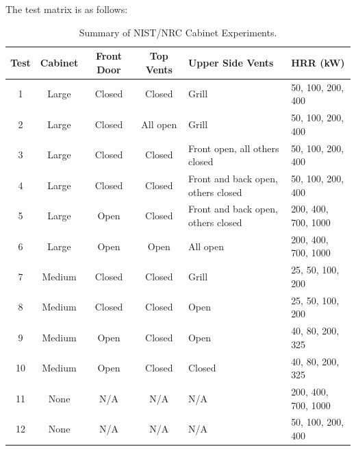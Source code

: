 The test matrix is as follows:
\begin{table}[!ht]
\centering
\caption[Summary of NIST/NRC Cabinet Experiments]{Summary of NIST/NRC Cabinet Experiments.}
\begin{tabular}{|c|c|c|c|l|l|}
\hline
Test   & Cabinet    & Front Door & Top Vents        & Upper Side Vents                   & HRR (kW)               \\ \hline \hline
1      & Large      & Closed     & Closed           & Grill                              & 50, 100, 200, 400      \\ \hline
2      & Large      & Closed     & All open         & Grill                              & 50, 100, 200, 400      \\ \hline
3      & Large      & Closed     & Closed           & Front open, all others closed      & 50, 100, 200, 400      \\ \hline
4      & Large      & Closed     & Closed           & Front and back open, others closed & 50, 100, 200, 400      \\ \hline
5      & Large      & Open       & Closed           & Front and back open, others closed & 200, 400, 700, 1000    \\ \hline
6      & Large      & Open       & Open             & All open                           & 200, 400, 700, 1000    \\ \hline
7      & Medium     & Closed     & Closed           & Grill                              & 25, 50, 100, 200       \\ \hline
8      & Medium     & Closed     & Closed           & Open                               & 25, 50, 100, 200       \\ \hline
9      & Medium     & Open       & Closed           & Open                               & 40, 80, 200, 325       \\ \hline
10     & Medium     & Open       & Closed           & Closed                             & 40, 80, 200, 325       \\ \hline
11     & None       & N/A        & N/A              & N/A                                & 200, 400, 700, 1000    \\ \hline
12     & None       & N/A        & N/A              & N/A                                & 50, 100, 200, 400      \\ \hline
\end{tabular}
\label{tab:NIST_Cabinet_Experiments}
\end{table}


\FloatBarrier

